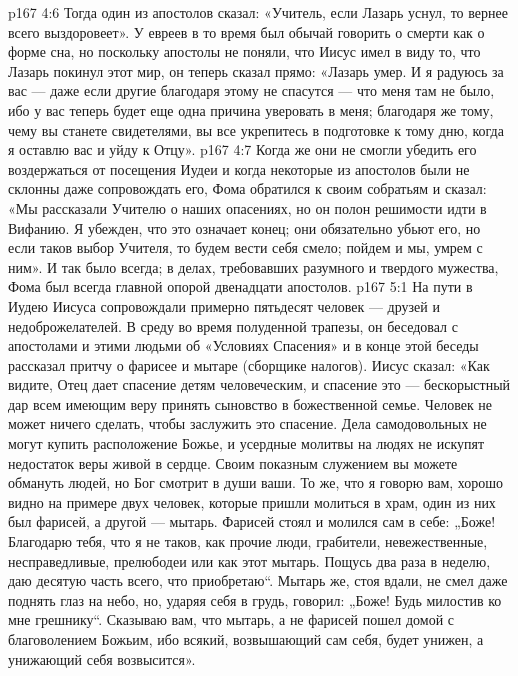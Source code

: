 \vs p167 4:6 Тогда один из апостолов сказал: «Учитель, если Лазарь уснул, то вернее всего выздоровеет». У евреев в то время был обычай говорить о смерти как о форме сна, но поскольку апостолы не поняли, что Иисус имел в виду то, что Лазарь покинул этот мир, он теперь сказал прямо: «Лазарь умер. И я радуюсь за вас --- даже если другие благодаря этому не спасутся --- что меня там не было, ибо у вас теперь будет еще одна причина уверовать в меня; благодаря же тому, чему вы станете свидетелями, вы все укрепитесь в подготовке к тому дню, когда я оставлю вас и уйду к Отцу».
\vs p167 4:7 Когда же они не смогли убедить его воздержаться от посещения Иудеи и когда некоторые из апостолов были не склонны даже сопровождать его, Фома обратился к своим собратьям и сказал: «Мы рассказали Учителю о наших опасениях, но он полон решимости идти в Вифанию. Я убежден, что это означает конец; они обязательно убьют его, но если таков выбор Учителя, то будем вести себя смело; пойдем и мы, умрем с ним». И так было всегда; в делах, требовавших разумного и твердого мужества, Фома был всегда главной опорой двенадцати апостолов.
\vs p167 5:1 На пути в Иудею Иисуса сопровождали примерно пятьдесят человек --- друзей и недоброжелателей. В среду во время полуденной трапезы, он беседовал с апостолами и этими людьми об «Условиях Спасения» и в конце этой беседы рассказал притчу о фарисее и мытаре (сборщике налогов). Иисус сказал: «Как видите, Отец дает спасение детям человеческим, и спасение это --- бескорыстный дар всем имеющим веру принять сыновство в божественной семье. Человек не может ничего сделать, чтобы заслужить это спасение. Дела самодовольных не могут купить расположение Божье, и усердные молитвы на людях не искупят недостаток веры живой в сердце. Своим показным служением вы можете обмануть людей, но Бог смотрит в души ваши. То же, что я говорю вам, хорошо видно на примере двух человек, которые пришли молиться в храм, один из них был фарисей, а другой --- мытарь. Фарисей стоял и молился сам в себе: „Боже! Благодарю тебя, что я не таков, как прочие люди, грабители, невежественные, несправедливые, прелюбодеи или как этот мытарь. Пощусь два раза в неделю, даю десятую часть всего, что приобретаю“. Мытарь же, стоя вдали, не смел даже поднять глаз на небо, но, ударяя себя в грудь, говорил: „Боже! Будь милостив ко мне грешнику“. Сказываю вам, что мытарь, а не фарисей пошел домой с благоволением Божьим, ибо всякий, возвышающий сам себя, будет унижен, а унижающий себя возвысится».
